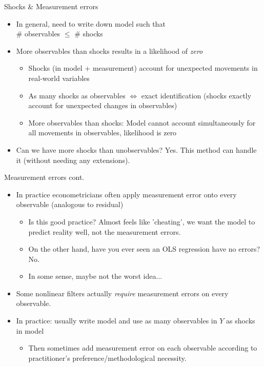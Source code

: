 \documentclass{beamer}
\begin{document}
\begin{frame}{Shocks \& Measurement errors}
\begin{itemize}
\item In general, need to write down model such that \\ \# observables $\leq$ \# shocks
\item More observables than shocks results in a likelihood of \textit{zero}
\begin{itemize}
\item Shocks (in model + measurement) account for unexpected movements in real-world variables
\item As many shocks as observables $\iff$ exact identification (shocks exactly account for unexpected changes in observables)
\item More observables than shocks: Model cannot account simultaneously for all movements in observables, likelihood is zero
\end{itemize}
\item Can we have more shocks than unobservables? Yes. This method can handle it (without needing any extensions).
\end{itemize}
\end{frame}

\begin{frame}{Measurement errors cont.}
\begin{itemize}
\item In practice econometricians often apply measurement error onto every observable (analogous to residual)
\begin{itemize}
\item Is this good practice? Almost feels like 'cheating', we want the model to predict reality well, not the measurement errors.
\item On the other hand, have you ever seen an OLS regression have no errors? No.
\item In some sense, maybe not the worst idea...
\end{itemize}
\item Some nonlinear filters actually \textit{require} measurement errors on every observable.
\item In practice: usually write model and use as many observables in $Y$ as shocks in model
\begin{itemize}
\item Then sometimes add measurement error on each observable according to practitioner's preference/methodological necessity.
\end{itemize}
\end{itemize}


\end{frame}
\end{document}
